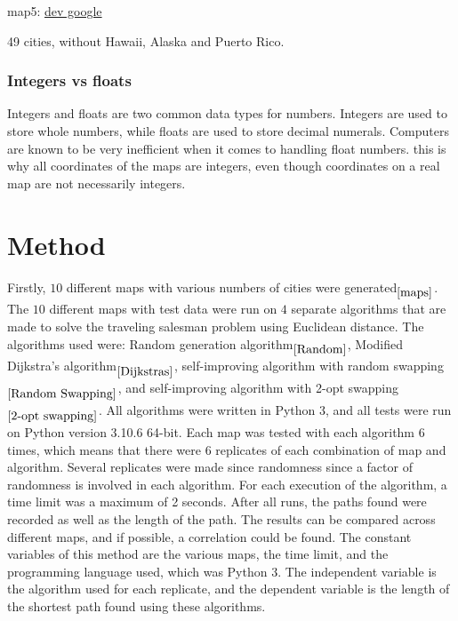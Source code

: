 \documentclass{article}
\begin{document}
map5: \href{https://developers.google.com/public-data/docs/canonical/states_csv}{dev google}

49 cities, without Hawaii, Alaska and Puerto Rico.


\subsubsection{Integers vs floats}\label{Int vs Float}
Integers and floats are two common data types for numbers. Integers are used to store whole numbers, while floats are used to store decimal numerals. Computers are known to be very inefficient when it comes to handling float numbers.
this is why all coordinates of the maps are integers, even though coordinates on a real map are not necessarily integers. 




\section{Method}\label{Method}
Firstly, $10$ different maps with various numbers of cities were generated$_{\ref{maps}}$. The $10$ different maps with test data were run on $4$ separate algorithms that are made to solve the traveling salesman problem using Euclidean distance. The algorithms used were: Random generation algorithm$_{\ref{Random}}$, Modified Dijkstra's algorithm$_{\ref{Dijkstras}}$, self-improving algorithm with random swapping$_{\ref{Random Swapping}}$, and self-improving algorithm with 2-opt swapping$_{\ref{2-opt swapping}}$. All algorithms were written in Python 3, and all tests were run on Python version 3.10.6 64-bit. Each map was tested with each algorithm $6$ times, which means that there were $6$ replicates of each combination of map and algorithm. Several replicates were made since randomness since a factor of randomness is involved in each algorithm. For each execution of the algorithm, a time limit was a maximum of 2 seconds. After all runs, the paths found were recorded as well as the length of the path. The results can be compared across different maps, and if possible, a correlation could be found. 
\noindent
The constant variables of this method are the various maps, the time limit, and the programming language used, which was Python 3. The independent variable is the algorithm used for each replicate, and the dependent variable is the length of the shortest path found using these algorithms.
\end{document}
